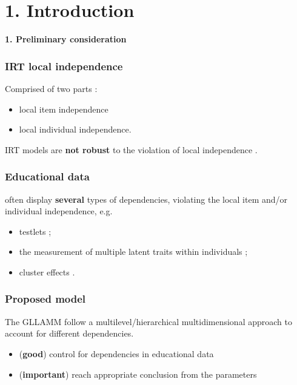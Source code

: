 \documentclass[arial,12pt,xcolor=dvipsnames]{beamer}
\begin{document}
\section{1. Introduction}
%
\begin{frame}
	\textbf{1. Preliminary consideration}
\end{frame}
%
\begin{frame}
	\frametitle{IRT local independence}
	Comprised of two parts \cite{Baker_2001, Hambleton_et_al_1991a}:
	\begin{itemize}
		\item local item independence 
		\item local individual independence.
	\end{itemize}
	\vspace{0.3cm} IRT models are \textbf{not robust} to the violation of local independence \cite{Yen_1984, Chen_et_al_1997, Jiao_et_al_2012}. 
\end{frame}
%
\begin{frame}
	\frametitle{Educational data}
	often display \textbf{several} types of dependencies, violating the local item and/or individual independence, e.g.
	\begin{itemize}
		\item testlets \cite{Wainer_et_al_2007};  
		\item the measurement of multiple latent traits within individuals \cite{Reckase_2009}; 
		\item cluster effects \cite{Raudenbush_et_al_2002}.
	\end{itemize}
\end{frame}
%
\begin{frame}
	\frametitle{Proposed model}
	The GLLAMM follow a multilevel/hierarchical multidimensional approach to account for different dependencies. \\
	\begin{itemize}
		\item (\textbf{good}) control for dependencies in educational data
		\item (\textbf{important}) reach appropriate conclusion from the parameters 
	\end{itemize}
\end{frame}
%
\end{document}
